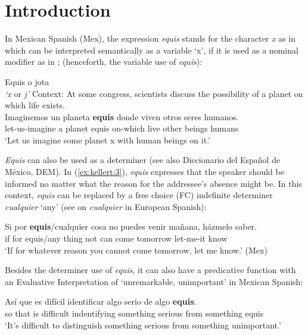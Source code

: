 \documentclass[output=paper]{langsci/langscibook}
\author{Olga Kellert\affiliation{Georg-August-Universität Göttingen}}
\begin{document}
\maketitle
\section{Introduction}\label{sec:kellert:1}
In Mexican Spanish (Mex), the expression \textit{equis} stands for the character \textit{x} as in  which can be interpreted semantically as a variable ‘x’, if it is used as a nominal modifier as in ; (henceforth, the variable use of \textit{equis}):

\ea\label{ex:kellert:1}
Equis o jota\\
\textit{`x} or \textit{j'}
\ex \label{ex:kellert:2}
Context: At some congress, scientists discuss the possibility of a planet on which life exists.\\
\gll Imaginemos un planeta \textbf{equis} donde viven otros seres humanos.\\
let-us-imagine a planet equis on-which live other beings humans\\
\glt `Let us imagine some planet x with human beings on it.'
\z

\textit{Equis} can also be used as a determiner (see also Diccionario del Español de México, DEM). In (\ref{ex:kellert:3}), \textit{equis} expresses that the speaker should be informed no matter what the reason for the addressee’s absence might be. In this context, \textit{equis} can be replaced by a free choice (FC) indefinite determiner \textit{cualquier} ‘any’ (see \citealt{AM2011} on \textit{cualquier} in European Spanish):

\ea\label{ex:kellert:3}
\gll Si por \textbf{equis}/cualquier cosa no puedes venir mañana, házmelo saber.\\
if for equis/any thing not can come tomorrow let-me-it know\\
\glt ‘If for whatever reason you cannot come tomorrow, let me know.’ (Mex)
\z

Besides the determiner use of \textit{equis}, it can also have a predicative function with an Evaluative Interpretation of ‘unremarkable, unimportant’ in Mexican Spanish:

\ea\label{ex:kellert:4}
\gll Así que es difícil identificar algo serio de algo \textbf{equis}.\\
so that is difficult indentifying something serious from something equis\\
\glt ‘It’s difficult to distinguish something serious from something unimportant.’
\z
\end{document}
